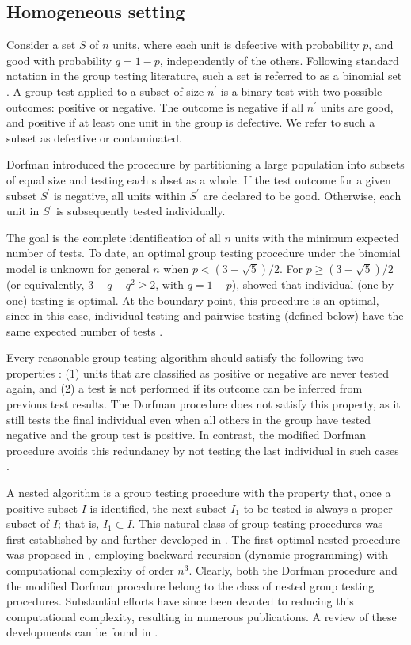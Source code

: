 \documentclass[12pt]{article}
\begin{document}
\subsection{Homogeneous setting}
Consider a set $S$ of $n$ units, where each unit is defective with probability $p$, and good with probability $q=1-p$, independently of the others. Following standard notation in the group testing literature, such a set is referred to as a binomial set \citep{SG1959}. A group test applied to a subset of size $n^{\prime}$ is a binary test with two possible outcomes: positive or negative. The outcome is negative if all $n^{\prime}$ units are good, and positive if at least one unit in the group is defective. We refer to such a subset as defective or contaminated.

Dorfman introduced the procedure by partitioning a large population into subsets of equal size and testing each subset as a whole. If the test outcome for a given subset $S^{\prime}$
is negative, all units within $S^{\prime}$
are declared to be good. Otherwise, each unit in
$S^{\prime}$ is subsequently tested individually.


The goal is the complete identification of all $n$ units with the minimum expected number of tests. To date, an optimal group testing procedure under the binomial model is unknown for general $n$ when $\displaystyle p<(3-\sqrt{5})/2$.
For $\displaystyle p\geq(3-\sqrt{5})/2$ (or equivalently, $3-q-q^2\geq 2$, with $q=1-p$), \cite{U1960} showed that individual (one-by-one) testing is optimal. At the boundary point, this procedure is an optimal, since in this case, individual testing and pairwise testing (defined below) have the same expected number of tests \citep{YH1990}.

Every reasonable group testing algorithm should satisfy the following two properties \citep{SG1959, U1960}: (1) units that are classified as positive or negative are never tested again, and (2) a test is not performed if its outcome can be inferred from previous test results. The Dorfman procedure does not satisfy this property, as it still tests the final individual even when all others in the group have tested negative and the group test is positive. In contrast, the modified Dorfman procedure avoids this redundancy by not testing the last individual in such cases \citep{SG1959}.

A nested algorithm is a group testing procedure with the property that, once a positive subset $I$ is identified, the next subset $I_1$
to be tested is always a proper subset of $I$; that is, $I_1\subset I.$ This natural class of group testing procedures was first established  by \cite{SG1959} and further developed in \cite{S1960}.
The first optimal nested procedure was proposed in \cite{SG1959}, employing backward recursion (dynamic programming) with computational complexity of order $n^3$.
Clearly, both the Dorfman procedure and the modified Dorfman procedure belong to the class of nested group testing procedures.
Substantial efforts have since been devoted to reducing this computational complexity, resulting in numerous publications. A review of these developments can be found in \cite{MA2019, MA2021}.
\end{document}
